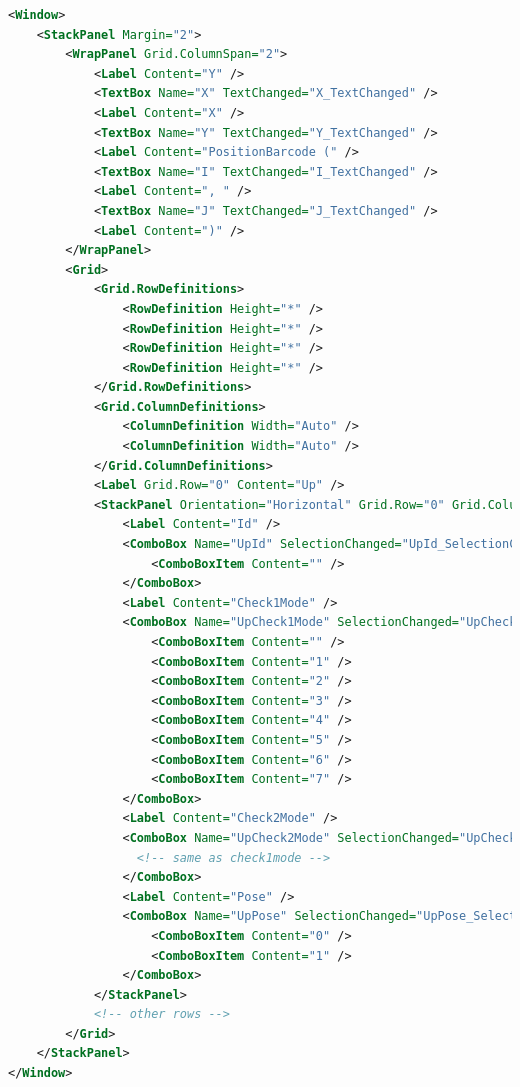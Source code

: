 \begin{lstlisting}[language=XML]
<Window>
    <StackPanel Margin="2">
        <WrapPanel Grid.ColumnSpan="2">
            <Label Content="Y" />
            <TextBox Name="X" TextChanged="X_TextChanged" />
            <Label Content="X" />
            <TextBox Name="Y" TextChanged="Y_TextChanged" />
            <Label Content="PositionBarcode (" />
            <TextBox Name="I" TextChanged="I_TextChanged" />
            <Label Content=", " />
            <TextBox Name="J" TextChanged="J_TextChanged" />
            <Label Content=")" />
        </WrapPanel>
        <Grid>
            <Grid.RowDefinitions>
                <RowDefinition Height="*" />
                <RowDefinition Height="*" />
                <RowDefinition Height="*" />
                <RowDefinition Height="*" />
            </Grid.RowDefinitions>
            <Grid.ColumnDefinitions>
                <ColumnDefinition Width="Auto" />
                <ColumnDefinition Width="Auto" />
            </Grid.ColumnDefinitions>
            <Label Grid.Row="0" Content="Up" />
            <StackPanel Orientation="Horizontal" Grid.Row="0" Grid.Column="2" Margin="2">
                <Label Content="Id" />
                <ComboBox Name="UpId" SelectionChanged="UpId_SelectionChanged" >
                    <ComboBoxItem Content="" />
                </ComboBox>
                <Label Content="Check1Mode" />
                <ComboBox Name="UpCheck1Mode" SelectionChanged="UpCheck1Mode_SelectionChanged">
                    <ComboBoxItem Content="" />
                    <ComboBoxItem Content="1" />
                    <ComboBoxItem Content="2" />
                    <ComboBoxItem Content="3" />
                    <ComboBoxItem Content="4" />
                    <ComboBoxItem Content="5" />
                    <ComboBoxItem Content="6" />
                    <ComboBoxItem Content="7" />
                </ComboBox>
                <Label Content="Check2Mode" />
                <ComboBox Name="UpCheck2Mode" SelectionChanged="UpCheck2Mode_SelectionChanged">
                  <!-- same as check1mode -->
                </ComboBox>
                <Label Content="Pose" />
                <ComboBox Name="UpPose" SelectionChanged="UpPose_SelectionChanged">
                    <ComboBoxItem Content="0" />
                    <ComboBoxItem Content="1" />
                </ComboBox>
            </StackPanel>
            <!-- other rows -->
        </Grid>
    </StackPanel>
</Window>
\end{lstlisting}

